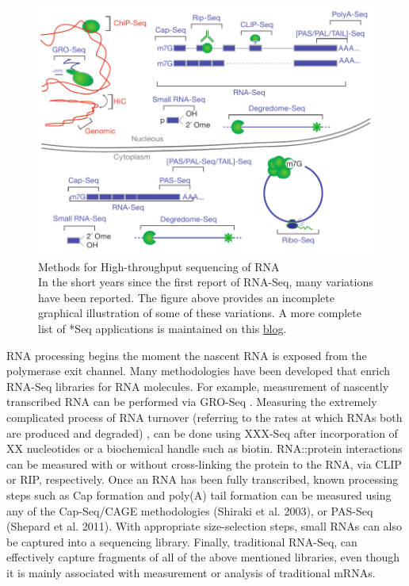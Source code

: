 \begin{figure}[htbp]
	\centering 
	\includegraphics{Figures/RNA_Sequencing_methodologies.pdf}
	\caption[Methods for High-throughput sequencing of RNA]
	{
		Methods for High-throughput sequencing of RNA\\[0.25cm]
		In the short years since the first report of RNA-Seq, many variations have been reported. The figure above provides an incomplete graphical illustration of some of these variations. A more complete list of *Seq applications is maintained on this \href{http://liorpachter.wordpress.com/seq/}{blog}.
	}
	\label{fig:htsMethods}
\end{figure}

RNA processing begins the moment the nascent RNA is exposed from the polymerase exit channel. Many methodologies have been developed that enrich RNA-Seq libraries for RNA molecules. For example, measurement of nascently transcribed RNA can be performed via GRO-Seq \citep{Core2008a}. Measuring the extremely complicated process of RNA turnover (referring to the rates at which RNAs both are produced and degraded) \citep{Ghosh2010a}, can be done using XXX-Seq after incorporation of XX nucleotides or a biochemical handle such as biotin. 
RNA::protein interactions can be measured with or without cross-linking the protein to the RNA, via CLIP or RIP, respectively. Once an RNA has been fully transcribed, known processing steps such as Cap formation and poly(A) tail formation can be measured using any of the Cap-Seq/CAGE methodologies (Shiraki et al. 2003), or PAS-Seq (Shepard et al. 2011). With appropriate size-selection steps, small RNAs \citep{Ghildiyal2008} can also be captured into a sequencing library. Finally, traditional RNA-Seq, can effectively capture fragments of all of the above mentioned libraries, even though it is mainly associated with measurement or analysis of traditional mRNAs.

